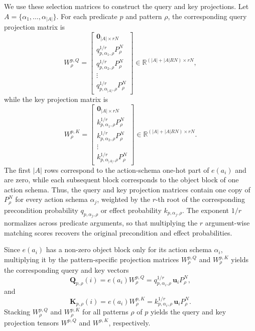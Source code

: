 We use these selection matrices to construct the query and key projections.
Let $A=\{\alpha_1,\ldots,\alpha_{|A|}\}$.
For each predicate $p$ and pattern $\rho$, the corresponding query projection
matrix is
\begin{equation}
W^{p,Q}_{\rho}
=
\begin{bmatrix}
\mathbf{0}_{|A|\times rN}\\[3pt]
q_{p,\alpha_1,\rho}^{1/r}P_{\rho}^{N}\\[3pt]
q_{p,\alpha_2,\rho}^{1/r}P_{\rho}^{N}\\[3pt]
\vdots\\[3pt]
q_{p,\alpha_{|A|},\rho}^{1/r}P_{\rho}^{N}
\end{bmatrix}
\in
\mathbb{R}^{(|A|+|A|RN)\times rN},
\label{eq:strips-query-projection}
\end{equation}
while the key projection matrix is
\begin{equation}
W^{p,K}_{\rho}
=
\begin{bmatrix}
\mathbf{0}_{|A|\times rN}\\[3pt]
k_{p,\alpha_1,\rho}^{1/r}P_{\rho}^{N}\\[3pt]
k_{p,\alpha_2,\rho}^{1/r}P_{\rho}^{N}\\[3pt]
\vdots\\[3pt]
k_{p,\alpha_{|A|},\rho}^{1/r}P_{\rho}^{N}
\end{bmatrix}
\in
\mathbb{R}^{(|A|+|A|RN)\times rN}.
\label{eq:strips-key-projection}
\end{equation}
The first $|A|$ rows correspond to the action-schema one-hot part of
$e(a_i)$ and are zero, while each subsequent block corresponds to the object
block of one action schema.
Thus, the query and key projection matrices contain one copy of
$P_{\rho}^{N}$ for every action schema $\alpha_j$,
weighted by the $r$-th root of the corresponding precondition probability
$q_{p,\alpha_j,\rho}$ or effect probability $k_{p,\alpha_j,\rho}$.
The exponent $1/r$ normalizes across predicate arguments, so that multiplying
the $r$ argument-wise matching scores recovers the original precondition and
effect probabilities.

Since $e(a_i)$ has a non-zero object block only for its action schema
$\alpha_i$, multiplying it by the pattern-specific projection matrices
$W^{p,Q}_{\rho}$ and $W^{p,K}_{\rho}$ yields the corresponding query and key
vectors
\begin{equation}
\mathbf{Q}_{p,\rho}(i)
=
e(a_i)W^{p,Q}_{\rho}
=
q_{p,\alpha_i,\rho}^{1/r}
\,\mathbf{u}_i P_{\rho}^{N},
\label{eq:strips-query-full}
\end{equation}
and
\begin{equation}
\mathbf{K}_{p,\rho}(i)
=
e(a_i)W^{p,K}_{\rho}
=
k_{p,\alpha_i,\rho}^{1/r}
\,\mathbf{u}_i P_{\rho}^{N}.
\label{eq:strips-key-full}
\end{equation}
Stacking $W^{p,Q}_{\rho}$ and $W^{p,K}_{\rho}$ for all patterns $\rho$ of $p$
yields the query and key projection tensors $W^{p,Q}$ and $W^{p,K}$,
respectively.

